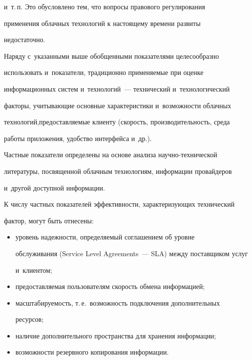и~т.\,п. Это обусловлено тем, что вопросы правового регулирования 

применения облачных технологий к настоящему времени развиты 

недостаточно.

  

  Наряду с~указанными выше обобщенными показателями целесообразно 

использовать и~показатели, традиционно применяемые при оценке 

инфор\-ма\-ционных систем и~технологий~--- технический и~технологический 

факторы, учи\-тывающие основные характеристики и~возможности облачных 

технологий,\linebreak предоставляемые клиенту (скорость, производительность, среда 

работы приложения, удобство интерфейса и~др.). 

  

  Частные показатели определены на основе анализа научно-технической 

литературы, посвященной облачным технологиям, информации провайдеров 

и~другой доступной информации. 

  

  К числу частных показателей эффективности, характеризующих технический 

фактор, могут быть отнесены:

  \begin{itemize}

  \item уровень надежности, определяемый соглашением об уровне 

обслуживания (Service Level Agreements~--- SLA) между поставщиком услуг 

и~клиентом;

  \item предоставляемая пользователям скорость обмена информацией;

  \item масштабируемость, т.\,е.\ возможность подключения дополнительных 

ресурсов;

  \item наличие дополнительного пространства для хранения информации;

  \item возможности резервного копирования информации.

  \end{itemize}

